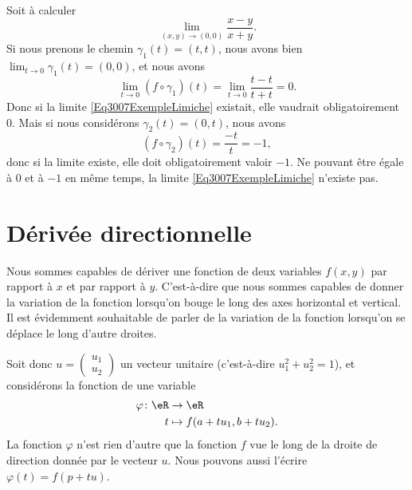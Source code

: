 \begin{example}
	Soit à calculer
	\begin{equation}	\label{Eq3007ExempleLimiche}
		\lim_{(x,y)\to(0,0)}\frac{ x-y }{ x+y }.
	\end{equation}
	Si nous prenons le chemin \( \gamma_1(t)=(t,t)\), nous avons bien \( \lim_{t\to 0} \gamma_1(t)=(0,0)\), et nous avons
	\begin{equation}
		\lim_{t\to 0} (f\circ\gamma_1)(t)=\lim_{t\to 0} \frac{ t-t }{ t+t }=0.
	\end{equation}
	Donc si la limite \eqref{Eq3007ExempleLimiche} existait, elle vaudrait obligatoirement \( 0\). Mais si nous considérons \( \gamma_2(t)=(0,t)\), nous avons
	\begin{equation}
		(f\circ\gamma_2)(t)=\frac{ -t }{ t }=-1,
	\end{equation}
	donc si la limite existe, elle doit obligatoirement valoir \( -1\). Ne pouvant être égale à \( 0\) et à \( -1\) en même temps, la limite \eqref{Eq3007ExempleLimiche} n'existe pas.
\end{example}

\section{Dérivée directionnelle}

Nous sommes capables de dériver une fonction de deux variables \( f(x,y)\) par rapport à \( x\) et par rapport à \( y\). C'est-à-dire que nous sommes capables de donner la variation de la fonction lorsqu'on bouge le long des axes horizontal et vertical. Il est évidemment souhaitable de parler de la variation de la fonction lorsqu'on se déplace le long d'autre droites.

Soit donc \( u=\begin{pmatrix}
	u_1 \\
	u_2
\end{pmatrix}\) un vecteur unitaire (c'est-à-dire \( u_1^2+u_2^2=1\)), et considérons la fonction de une variable
\begin{equation}
	\begin{aligned}
		\varphi\colon \eR & \to \eR                   \\
		t                 & \mapsto f(a+tu_1,b+tu_2).
	\end{aligned}
\end{equation}
La fonction \( \varphi\) n'est rien d'autre que la fonction \( f\) vue le long de la droite de direction donnée par le vecteur \( u\). Nous pouvons aussi l'écrire \( \varphi(t)=f(p+tu)\).

